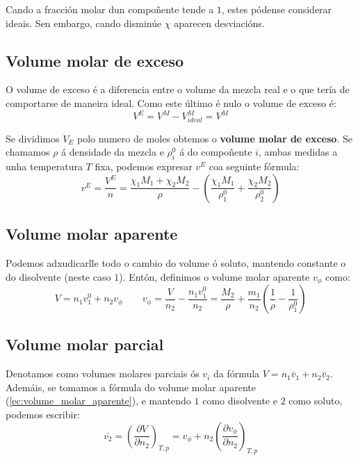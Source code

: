 \documentclass[12pt, a4paper, titlepage]{article}
\begin{document}
  Cando a fracción molar dun compoñente tende a $1$, estes pódense considerar ideais. Sen embargo, cando disminúe $\chi$ aparecen desviacións.

  \subsection{Volume molar de exceso}

  O volume de exceso é a diferencia entre o volume da mezcla real e o que tería de comportarse de maneira ideal. Como este último é nulo o volume de exceso é:
  \begin{equation}
    V^E = V^M - V^M_{ideal} = V^M
    \label{ec:volume_exceso}
  \end{equation}

  Se dividimos $V_E$ polo numero de moles obtemos o \textbf{volume molar de exceso}. Se chamamos $\rho$ á densidade da mezcla e $\rho_i^0$ á do compoñente $i$, ambas medidas a unha temperatura $T$ fixa, podemos expresar $v^E$ coa seguinte fórmula:
  \begin{equation}
    v^E = \frac{V^E}{n} = \frac{\chi_1 M_1 + \chi_2 M_2}{\rho} - \left( \frac{\chi_1 M_1}{\rho_1^0} + \frac{\chi_2 M_2}{\rho_2^0} \right)
    \label{ec:volume_molar_exceso}
  \end{equation}

  \subsection{Volume molar aparente}

  Podemos adxudicarlle todo o cambio do volume ó soluto, mantendo constante o do disolvente (neste caso $1$). Entón, definimos o volume molar aparente $v_\phi$ como:
  \begin{equation}
    V = n_1 v_1^0 + n_2 v_\phi \qquad v_\phi = \frac{V}{n_2} - \frac{n_1 v_1^0}{n_2} = \frac{M_2}{\rho} + \frac{m_1}{n_2} \left( \frac{1}{\rho} - \frac{1}{\rho^0_1} \right)
    \label{ec:volume_molar_aparente}
  \end{equation}

  \subsection{Volume molar parcial}

  Denotamos como volumes molares parciais ós $v_i$ da fórmula $V = n_1 \bar{v}_1 + n_2 \bar{v}_2$. Ademáis, se tomamos a fórmula do volume molar aparente (\ref{ec:volume_molar_aparente}), e mantendo $1$ como disolvente e $2$ como soluto, podemos escribir:
  \begin{equation}
    \bar{v_2} = \left( \frac{\partial V}{\partial n_2} \right)_{T,p} = v_\phi + n_2 \left( \frac{\partial v_\phi}{\partial n_2} \right)_{T,p}
  \end{equation}
\end{document}

